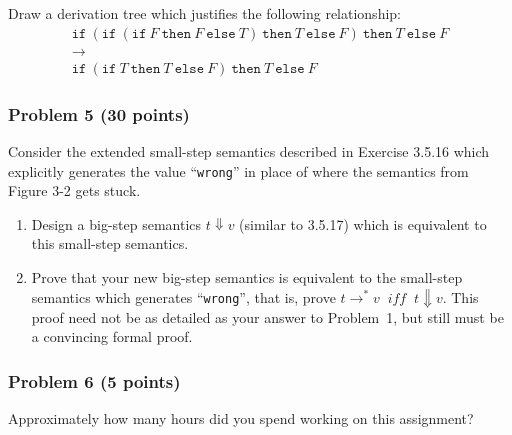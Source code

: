 \documentclass{article}
\begin{document}
Draw a derivation tree which justifies the following relationship:
\begin{gather*} 
  \texttt{if}
   \ (\texttt{if}
     \ (\texttt{if}\ F\ \texttt{then}\ F\ \texttt{else}\ T)
     \ \texttt{then}\ T
     \ \texttt{else}\ F)
   \ \texttt{then}\ T
   \ \texttt{else}\ F 
   \\ \longrightarrow
   \\ 
  \texttt{if}
   \ (\texttt{if}
     \ T
     \ \texttt{then}\ T
     \ \texttt{else}\ F)
   \ \texttt{then}\ T
   \ \texttt{else}\ F 
\end{gather*}

\subsubsection*{Problem 5 (30 points)}

Consider the extended small-step semantics described in Exercise 3.5.16 which
explicitly generates the value ``\texttt{wrong}'' in place of where the
semantics from Figure 3-2 gets stuck.

\begin{enumerate}
\item
  Design a big-step semantics $t \Downarrow v$ (similar to 3.5.17) which is
  equivalent to this small-step semantics.
\item
  Prove that your new big-step semantics is equivalent to the small-step
  semantics which generates ``\texttt{wrong}'', that is, prove $t
  \longrightarrow^* v\;\;\textit{iff}\;\;t \Downarrow v$. This proof need not
  be as detailed as your answer to Problem~1, but still must be a convincing
  formal proof.
\end{enumerate}

\subsubsection*{Problem 6 (5 points)}

Approximately how many hours did you spend working on this assignment?
\end{document}
